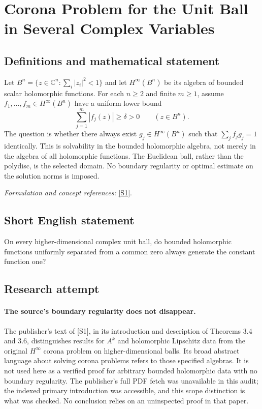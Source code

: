 \documentclass[11pt]{article}
\begin{document}
\section*{\texorpdfstring{Corona Problem for the Unit Ball in Several Complex Variables}{Corona Problem for the Unit Ball in Several Complex Variables}}\label{30006890}
\subsection{Definitions and mathematical statement}
Let $B^n=\{z\in{\mathbb{C}}^n:\sum_i|z_i|^2<1\}$ and let $H^\infty(B^n)$ be its algebra of bounded scalar holomorphic functions. For each $n\ge2$ and finite $m\ge1$, assume $f_1,\ldots,f_m\in H^\infty(B^n)$ have a uniform lower bound
\[
 \sum_{j=1}^m|f_j(z)|\ge\delta>0\qquad(z\in B^n).
\]
The question is whether there always exist $g_j\in H^\infty(B^n)$ such that $\sum_j f_jg_j=1$ identically. This is solvability in the bounded holomorphic algebra, not merely in the algebra of all holomorphic functions. The Euclidean ball, rather than the polydisc, is the selected domain. No boundary regularity or optimal estimate on the solution norms is imposed.
\par\smallskip\textit{Formulation and concept references:} \href{https://revista-em.unex.es/index.php/EM/article/download/2411/2144/7535}{[S1]}.

\subsection{Short English statement}
On every higher-dimensional complex unit ball, do bounded holomorphic functions uniformly separated from a common zero always generate the constant function one?
\subsection{Research attempt}
\paragraph{The source's boundary regularity does not disappear.}
The publisher's text of [S1], in its introduction and description
of Theorems 3.4 and 3.6, distinguishes results for $A^k$ and
holomorphic Lipschitz data from the original $H^\infty$ corona
problem on higher-dimensional balls. Its broad abstract language
about solving corona problems refers to those specified algebras.
It is not used here as a verified proof for arbitrary bounded
holomorphic data with no boundary regularity. The publisher's full
PDF fetch was unavailable in this audit; the indexed primary
introduction was accessible, and this scope distinction is what
was checked. No conclusion relies on an uninspected proof in that
paper.
\end{document}
